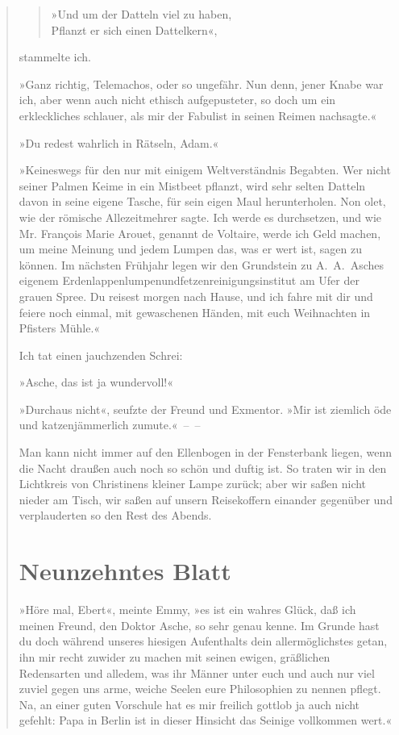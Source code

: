 \begin{verse}
\begin{verse}
»Und um der Datteln viel zu haben,\\
Pflanzt er sich einen Dattelkern«,
\end{verse}
\noindent
stammelte ich.

»Ganz richtig, Telemachos, oder so ungefähr. Nun denn, jener Knabe
war ich, aber wenn auch nicht ethisch aufgepusteter, so doch um ein
erkleckliches schlauer, als mir der Fabulist in seinen Reimen
nachsagte.«

»Du redest wahrlich in Rätseln, Adam.«

»Keineswegs für den nur mit einigem Weltverständnis Begabten. Wer
nicht seiner Palmen Keime in ein Mistbeet pflanzt, wird sehr selten
Datteln davon in seine eigene Tasche, für sein eigen Maul
herunterholen. Non olet, wie der römische Allezeitmehrer sagte. Ich
werde es durchsetzen, und wie Mr. François Marie Arouet, genannt de
Voltaire, werde ich Geld machen, um meine Meinung und jedem Lumpen
das, was er wert ist, sagen zu können. Im nächsten Frühjahr legen
wir den Grundstein zu A.~A.~Asches eigenem
Erdenlappenlumpenundfetzenreinigungsinstitut am Ufer der grauen
Spree. Du reisest morgen nach Hause, und ich fahre mit dir und
feiere noch einmal, mit gewaschenen Händen, mit euch Weihnachten in
Pfisters Mühle.«

Ich tat einen jauchzenden Schrei:

»Asche, das ist ja wundervoll!«

»Durchaus nicht«, seufzte der Freund und Exmentor. »Mir ist
ziemlich öde und katzenjämmerlich zumute.«~–~–

Man kann nicht immer auf den Ellenbogen in der Fensterbank liegen,
wenn die Nacht draußen auch noch so schön und duftig ist. So traten
wir in den Lichtkreis von Christinens kleiner Lampe zurück; aber
wir saßen nicht nieder am Tisch, wir saßen auf unsern Reisekoffern
einander gegenüber und verplauderten so den Rest des Abends.

\section{Neunzehntes Blatt}

»Höre mal, Ebert«, meinte Emmy, »es ist ein wahres Glück, daß ich
meinen Freund, den Doktor Asche, so sehr genau kenne. Im Grunde
hast du doch während unseres hiesigen Aufenthalts dein
allermöglichstes getan, ihn mir recht zuwider zu machen mit seinen
ewigen, gräßlichen Redensarten und alledem, was ihr Männer unter
euch und auch nur viel zuviel gegen uns arme, weiche Seelen eure
Philosophien zu nennen pflegt. Na, an einer guten Vorschule hat es
mir freilich gottlob ja auch nicht gefehlt: Papa in Berlin ist in
dieser Hinsicht das Seinige vollkommen wert.«


\end{verse}
